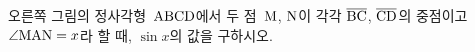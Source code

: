 \noindent\begin{minipage}[t]{0.58\linewidth}\vspace{0pt}\raggedright 오른쪽 그림의 정사각형~$\mathrm{ABCD}$에서 두 점~$\mathrm{M}$, $\mathrm{N}$이 각각 $\overline{\mathrm{BC}}$, $\overline{\mathrm{CD}}$의 중점이고 $\angle\mathrm{MAN}=x$라 할 때, $\sin x$의 값을 구하시오.\end{minipage}\hfill\begin{minipage}[t]{0.4\linewidth}\vspace{0pt}\centering \resizebox{\ifdim\width>\linewidth\linewidth\else\width\fi}{!}{}\end{minipage}\par
